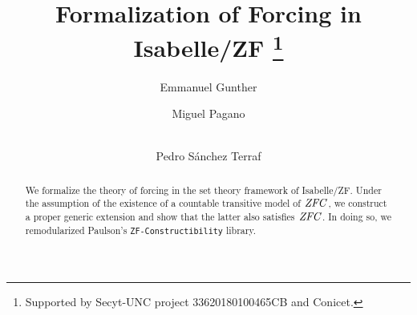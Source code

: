 \documentclass[runningheads]{llncs}
\begin{document}
%
\title{Formalization of Forcing in Isabelle/ZF%
  \thanks{Supported by Secyt-UNC project 33620180100465CB and Conicet.}%
}
%
%
\author{Emmanuel Gunther \and
Miguel Pagano \and \\
Pedro Sánchez Terraf%
}
%
%
%
\maketitle              %
%
\begin{abstract}
We formalize the theory of forcing in the set theory framework of
Isabelle/ZF. Under the assumption of the existence of a countable
transitive model of $\mathit{ZFC}$, we construct a proper generic extension and show
that the latter also satisfies $\mathit{ZFC}$. In doing so, we remodularized
Paulson's \verb|ZF-Constructibility| library.
\end{abstract}
%
%
%















%
%
%




% 
\end{document}
